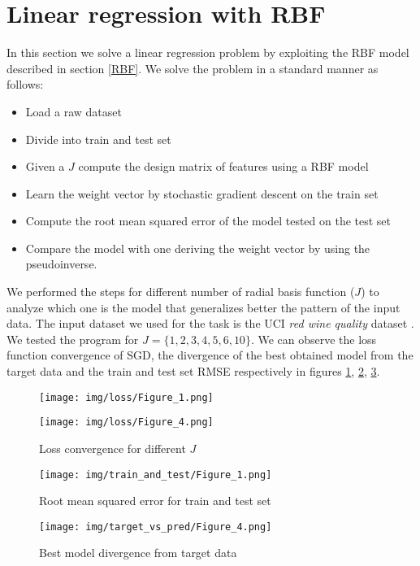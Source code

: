 \documentclass[runningheads]{llncs}
\begin{document}
\section{Linear regression with RBF}
In this section we solve a linear regression problem by exploiting the
RBF model described in section \ref{RBF}. We solve the problem in a
standard manner as follows:
\begin{itemize}
\item Load a raw dataset
\item Divide into train and test set
\item Given a $J$ compute the design matrix of features using a RBF model
\item Learn the weight vector by stochastic gradient descent on the train set
\item Compute the root mean squared error of the model tested
  on the test set
\item Compare the model with one deriving the weight vector by using the
  pseudoinverse.
\end{itemize}
We performed the steps for different number of radial basis function
($J$) to analyze which one is the model that generalizes better the
pattern of the input data. The input dataset we used for the task is
the UCI \textit{red wine quality} dataset \cite{wine_data}. We tested
the program for $J = \{1, 2, 3, 4, 5, 6, 10\}$. We can observe the
loss function convergence of SGD, the divergence of the best obtained
model from the target data and the train and test set RMSE
respectively in figures \ref{fig1}, \ref{fig2}, \ref{fig3}.
\begin{figure}[!tbp]
  \centering
  \begin{minipage}[b]{0.45\textwidth}
    \texttt{[image: img/loss/Figure\_1.png]}
  \end{minipage}
  \hfill
  \begin{minipage}[b]{0.45\textwidth}
    \texttt{[image: img/loss/Figure\_4.png]}
  \end{minipage}
 \caption{Loss convergence for different $J$}\label{fig1}
\end{figure}
\begin{figure}
    \centering
\texttt{[image: img/train\_and\_test/Figure\_1.png]}
\caption{Root mean squared error for train and test set}\label{fig2}
\end{figure}
\begin{figure}
    \centering
\texttt{[image: img/target\_vs\_pred/Figure\_4.png]}
\caption{Best model divergence from target data}\label{fig3}
\end{figure}
\end{document}

